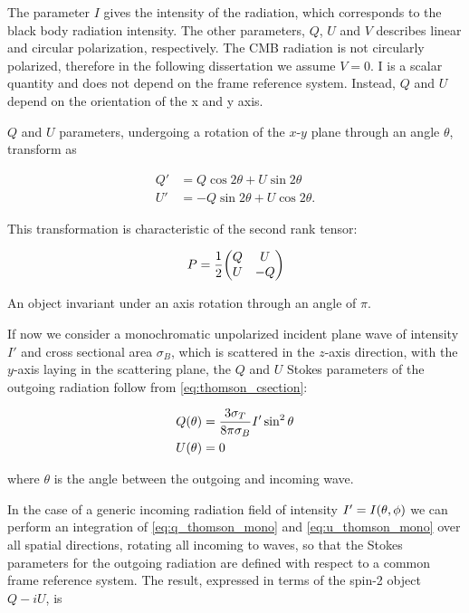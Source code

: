 The parameter $I$ gives the intensity of the radiation, which corresponds
to the black body radiation intensity. The other parameters, $Q$, $U$ and
$V$ describes linear and circular polarization, respectively. The CMB
radiation is not circularly polarized, therefore in the following
dissertation we assume $V = 0$. I is a scalar quantity and does not depend
on the frame reference system. Instead, $Q$ and $U$ depend on the
orientation of the x and y axis.

$Q$ and $U$ parameters, undergoing a rotation of the $x$-$y$ plane through
an angle $\theta$, transform as

\begin{align}
        Q' & = Q\cos{2\theta} + U\sin{2\theta} \\
        U' & = -Q\sin{2\theta} + U\cos{2\theta}.
\end{align}

This transformation is characteristic of the second rank tensor:

\begin{equation}
        P = \frac{1}{2} \mqty(Q & U \\
                              U & -Q)
\end{equation}

An object invariant under an axis rotation through an angle of $\pi$.

If now we consider a monochromatic unpolarized incident plane wave of
intensity $I'$ and cross sectional area $\sigma_B$, which is scattered in
the $z$-axis direction, with the $y$-axis laying in the scattering plane,
the $Q$ and $U$ Stokes parameters of the outgoing radiation follow from
\autoref{eq:thomson_csection}:

\begin{align}
        Q\qty(\theta) & = \frac{3\sigma_T}{8\pi\sigma_B}I'\sin^2\theta
        \label{eq:q_thomson_mono} \\
        U\qty(\theta) & = 0 \label{eq:u_thomson_mono}
\end{align}

where $\theta$ is the angle between the outgoing and incoming wave.

In the case of a generic incoming radiation field of intensity $I' =
I\qty(\theta,\phi)$ we can perform an integration of
\autoref{eq:q_thomson_mono} and \autoref{eq:u_thomson_mono} over all
spatial directions, rotating all incoming to waves, so that the Stokes
parameters for the outgoing radiation are defined with respect to a common
frame reference system. The result, expressed in terms of the spin-2 object
$Q - iU$, is \autocite{kosowsky1999introduction}

